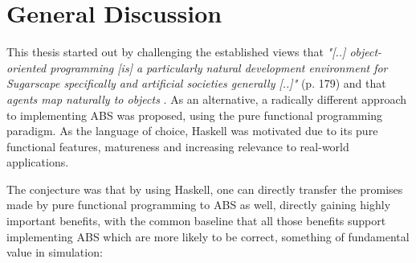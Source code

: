 \chapter{General Discussion}
\label{ch:discussion}
This thesis started out by challenging the established views that \textit{"[..] object-oriented programming [is] a particularly natural development environment for Sugarscape specifically and artificial societies generally [..]"} \cite{epstein_growing_1996} (p. 179) and that \textit{agents map naturally to objects} \cite{north_managing_2007}. As an alternative, a radically different approach to implementing ABS was proposed, using the pure functional programming paradigm. As the language of choice, Haskell was motivated due to its pure functional features, matureness and increasing relevance to real-world applications. 

The conjecture was that by using Haskell, one can directly transfer the promises made by pure functional programming to ABS as well, directly gaining highly important benefits, with the common baseline that all those benefits support implementing ABS which are more likely to be correct, something of fundamental value in simulation:

